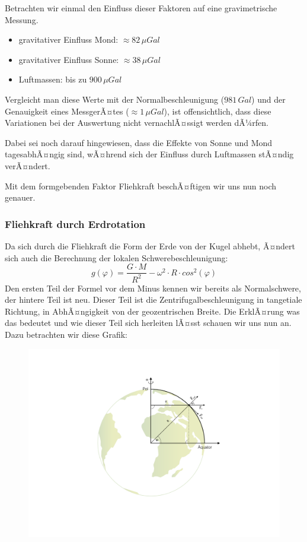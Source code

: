 Betrachten wir einmal den Einfluss dieser Faktoren auf eine gravimetrische Messung.  \begin{itemize}
	\item gravitativer Einfluss Mond: $\approx 82\,\si{\mu Gal}$
	\item gravitativer Einfluss Sonne: $\approx 38\,\si{\mu Gal}$
	\item Luftmassen: bis zu $900\,\si{\mu Gal}$
\end{itemize}
Vergleicht man diese Werte mit der Normalbeschleunigung ($981\,\si{Gal}$) und der Genauigkeit eines MessgerÃ¤tes ($\approx 1\,\si{\mu Gal}$), ist offensichtlich, dass diese Variationen bei der Auswertung nicht vernachlÃ¤ssigt werden dÃ¼rfen.

Dabei sei noch darauf hingewiesen, dass die Effekte von Sonne und Mond tagesabhÃ¤ngig sind, wÃ¤hrend sich der Einfluss durch Luftmassen stÃ¤ndig verÃ¤ndert. 


Mit dem formgebenden Faktor Fliehkraft beschÃ¤ftigen wir uns nun noch genauer.
 
\subsubsection*{Fliehkraft durch Erdrotation}

Da sich durch die Fliehkraft die Form der Erde von der Kugel abhebt, Ã¤ndert sich auch die Berechnung der lokalen Schwerebeschleunigung: \begin{equation*}
	g(\varphi) = \frac{G \cdot M}{R^2} - \omega^2 \cdot R \cdot cos^2(\varphi)
\end{equation*} 
Den ersten Teil der Formel vor dem Minus kennen wir bereits als Normalschwere, der hintere Teil ist neu. Dieser Teil ist die Zentrifugalbeschleunigung in tangetiale Richtung, in AbhÃ¤ngigkeit von der geozentrischen Breite. Die ErklÃ¤rung was das bedeutet und wie dieser Teil sich herleiten lÃ¤sst schauen wir uns nun an. Dazu betrachten wir diese Grafik:  

\begin{figure}[H]
\centering
  \includegraphics[width = \textwidth]{GravimetrieBilder/Fliehkraft}
\end{figure}

